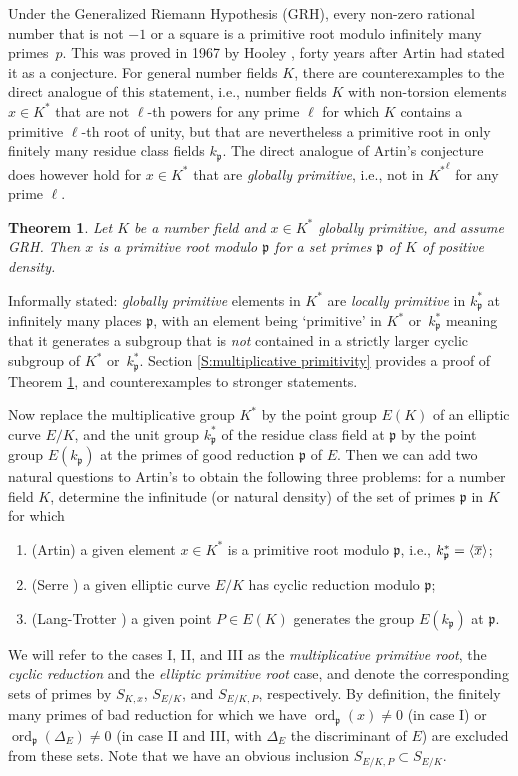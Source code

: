 \documentclass{amsart}
\theoremstyle{plain}
\newtheorem{theorem}{Theorem}[section]
\theoremstyle{definition}
\DeclareMathOperator{\ord}{ord}
\newcommand{\gothp}{{\mathfrak{p}}}
\newcommand{\mybar}[1]{
  \mathchoice
  {#1\llap{$\overline{\phantom{\displaystyle\rm#1}}$}}
  {#1\llap{$\overline{\phantom{\textstyle\rm#1}}$}}
  {#1\llap{$\overline{\phantom{\scriptstyle\rm#1}}$}}
  {#1\llap{$\overline{\phantom{\scriptscriptstyle\rm#1}}$}}
}
\renewcommand{\bar}{\mybar}
\begin{document}
\noindent
Under the Generalized Riemann Hypothesis (GRH), 
every non-zero rational number that is not $-1$ or a square is a primitive root modulo infinitely many primes~$p$.
This was proved in 1967 by Hooley \cite{Hooley},
forty years after Artin had stated it as a conjecture.
For general number fields $K$, there are counterexamples 
to the direct analogue of this statement, 
i.e., number fields $K$ with non-torsion elements $x\in K^*$ 
that are not $\ell$-th powers for any prime $\ell$ 
for which $K$ contains a primitive $\ell$-th root of unity, but that are nevertheless a primitive root in only 
finitely many residue class fields $k_\gothp$.
The direct analogue of Artin's conjecture does however hold
for $x\in K^*$ that are \emph{globally primitive}, i.e., 
not in ${K^*}^\ell$ for any prime $\ell$.
\begin{theorem}
\label{thm:mult-prim}
Let $K$ be a number field and $x\in K^*$ globally primitive, and assume GRH.
Then $x$ is a primitive root modulo $\gothp$ for a set primes $\gothp$ of $K$ of positive density.
\end{theorem}
\noindent
Informally stated: \emph{globally primitive} elements in $K^*$ are \emph{locally primitive} in $k_\gothp^*$ at infinitely many places $\gothp$,
with an element being `primitive' in $K^*$ or~$k_\gothp^*$ meaning that it generates a subgroup that 
is \emph{not} contained in a strictly larger cyclic subgroup of $K^*$ or~$k_\gothp^*$.
Section \ref{S:multiplicative primitivity} provides
a proof of Theorem \ref{thm:mult-prim}, and counterexamples to stronger statements.

Now replace the multiplicative group $K^*$ by the point group
$E(K)$ of an elliptic curve $E/K$, and the unit group $k_\gothp^*$ of the residue class field at $\gothp$ by the
point group $E(k_\gothp)$ at the primes of good reduction $\gothp$ of $E$.
Then we can add two natural questions to Artin's to obtain the following three problems:
for a number field $K$, determine the infinitude 
(or natural density) of the set of primes $\gothp$ in $K$ for which 
\begin{enumerate}
    \item[I.] (Artin) a given element $x\in K^*$ is a primitive root modulo $\gothp$, i.e., $k_\gothp^*=\langle\bar x\rangle$;
    \item [II.](Serre \cite{Serre3}) a given elliptic curve $E/K$ has cyclic reduction modulo $\gothp$;
    \item [III.](Lang-Trotter \cite{Lang-Trotter}) a given point $P\in E(K)$ generates the group $E(k_\gothp)$ at $\gothp$.
\end{enumerate}
We will refer to the cases I, II, and III as the 
\emph{multiplicative primitive root},
the \emph{cyclic reduction} and the 
\emph{elliptic primitive root} case, and denote the 
corresponding sets of primes by $S_{K, x}$, $S_{E/K}$, and 
$S_{E/K, P}$, respectively.
By definition, the finitely many primes of bad reduction for which we have 
$\ord_\gothp(x)\ne 0$ (in case I) or $\ord_\gothp(\Delta_E)\ne0$ (in case II and III, 
with $\Delta_E$ the discriminant of $E$) are excluded from these sets.
Note that we have an obvious inclusion 
$S_{E/K, P}\subset S_{E/K}$.
\end{document}
